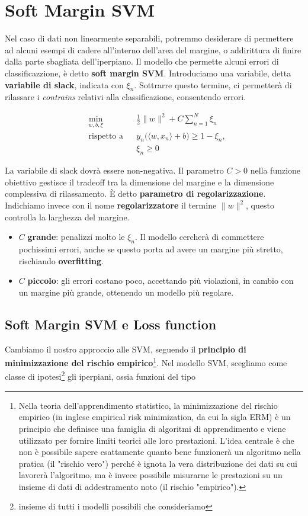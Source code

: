 \section{Soft Margin SVM}
Nel caso di dati non linearmente separabili, potremmo desiderare di permettere ad alcuni esempi di cadere all'interno dell'area del margine, o addirittura di finire dalla parte sbagliata dell'iperpiano. Il modello che permette alcuni errori di classificazzione, è detto \textbf{soft margin SVM}. Introduciamo una variabile, detta \textbf{variabile di slack}, indicata con $\xi_n$. Sottrarre questo termine, ci permetterà di rilassare i \textit{contrains} relativi alla classificazione, consentendo errori.

$$
\begin{aligned}
	&\min_{w,b,\xi} && \frac{1}{2}\|w\|^{2} + C \sum_{n=1}^{N} \xi_n \\
	&\text{rispetto a} && y_n \big( \langle w, x_n \rangle + b \big) \ge 1 - \xi_n, \\
	& && \xi_n \ge 0
\end{aligned}
$$

La variabile di slack dovrà essere non-negativa. Il parametro $C>0$ nella funzione obiettivo gestisce il tradeoff tra la dimensione del margine e la dimensione complessiva di rilassamento. È detto \textbf{parametro di regolarizzazione}. Indichiamo invece con il nome \textbf{regolarizzatore} il termine $\|w\|^2$, questo controlla la larghezza del margine. 

\begin{itemize}
	\item $C$ \textbf{grande}: penalizzi molto le $\xi_n$. Il modello cercherà di commettere pochissimi errori, anche se questo porta ad avere un margine più stretto, rischiando \textbf{overfitting}.
	\item $C$ \textbf{piccolo}: gli errori costano poco, accettando più violazioni, in cambio con un margine più grande, ottenendo un modello più regolare.
\end{itemize}


\subsection{Soft Margin SVM e Loss function}
Cambiamo il nostro approccio alle SVM, seguendo il \textbf{principio di minimizzazione del rischio empirico}\footnote{Nella teoria dell'apprendimento statistico, la minimizzazione del rischio empirico (in inglese empirical risk minimization, da cui la sigla ERM) è un principio che definisce una famiglia di algoritmi di apprendimento e viene utilizzato per fornire limiti teorici alle loro prestazioni.
L'idea centrale è che non è possibile sapere esattamente quanto bene funzionerà un algoritmo nella pratica (il "rischio vero") perché è ignota la vera distribuzione dei dati su cui lavorerà l'algoritmo, ma è invece possibile misurarne le prestazioni su un insieme di dati di addestramento noto (il rischio "empirico").}. 
Nel modello SVM, scegliamo come classe di ipotesi\footnote{insieme di tutti i modelli possibili che consideriamo} gli iperpiani, ossia funzioni del tipo

